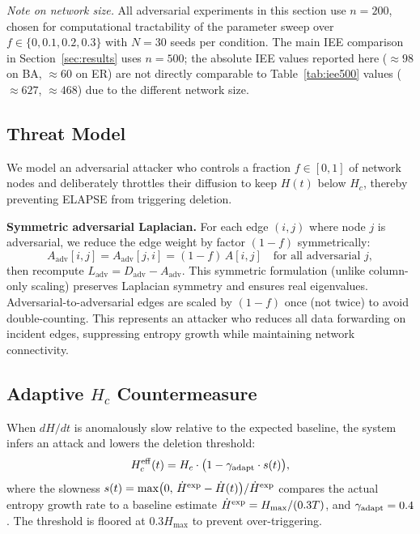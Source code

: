 \documentclass[review,12pt]{elsarticle}
\newcommand{\Hc}{H_c}
\newcommand{\Hmax}{H_{\max}}
\begin{document}
\emph{Note on network size.}  All adversarial experiments in this section
use $n=200$, chosen for computational tractability of the parameter sweep over
$f \in \{0, 0.1, 0.2, 0.3\}$ with $N=30$ seeds per condition.
The main IEE comparison in Section~\ref{sec:results} uses $n=500$; the
absolute IEE values reported here (${\approx}98$ on BA, ${\approx}60$ on ER)
are not directly comparable to Table~\ref{tab:iee500} values (${\approx}627$,
${\approx}468$) due to the different network size.

\subsection{Threat Model}

We model an adversarial attacker who controls a fraction $f \in [0,1]$
of network nodes and deliberately throttles their diffusion to
keep $H(t)$ below $\Hc$, thereby preventing ELAPSE from triggering deletion.

\textbf{Symmetric adversarial Laplacian.}  For each edge $(i,j)$ where node
$j$ is adversarial, we reduce the edge weight by factor $(1-f)$ symmetrically:
\begin{equation}
  A_{\mathrm{adv}}[i,j] = A_{\mathrm{adv}}[j,i] = (1-f)\,A[i,j]
  \quad \text{for all adversarial } j,
  \label{eq:adv_adj}
\end{equation}
then recompute $L_{\mathrm{adv}} = D_{\mathrm{adv}} - A_{\mathrm{adv}}$.
This symmetric formulation (unlike column-only scaling) preserves
Laplacian symmetry and ensures real eigenvalues. Adversarial-to-adversarial
edges are scaled by $(1-f)$ once (not twice) to avoid double-counting.
This represents an attacker who reduces all data forwarding on incident edges,
suppressing entropy growth while maintaining network connectivity.

\subsection{Adaptive \texorpdfstring{$H_c$}{Hc} Countermeasure}

When $dH/dt$ is anomalously slow relative to the expected baseline, the
system infers an attack and lowers the deletion threshold:
\begin{equation}
  \Hc^{\rm eff}(t) = \Hc \cdot \bigl(1 - \gamma_{\rm adapt} \cdot s(t)\bigr),
  \label{eq:adaptive_hc}
\end{equation}
where the slowness $s(t) = \max\bigl(0,\, \dot{H}^{\rm exp} - \dot{H}(t)\bigr) / \dot{H}^{\rm exp}$
compares the actual entropy growth rate to a baseline estimate
$\dot{H}^{\rm exp} = \Hmax / (0.3T)$, and $\gamma_{\rm adapt} = 0.4$.
The threshold is floored at $0.3\Hmax$ to prevent over-triggering.
\end{document}
